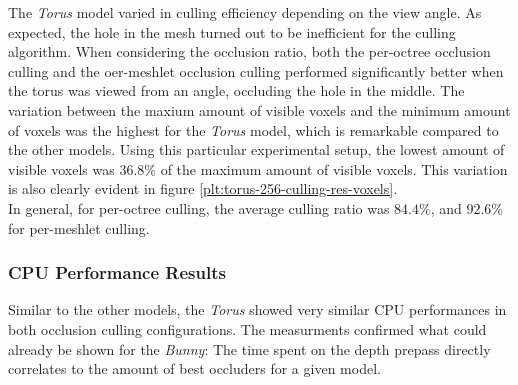 
\noindent
The \emph{Torus} model varied in culling efficiency depending on the view angle. As expected, the hole 
in the mesh turned out to be inefficient for the culling algorithm. When considering the occlusion ratio, 
both the per-octree occlusion culling and the oer-meshlet occlusion culling performed significantly better 
when the torus was viewed from an angle, occluding the hole in the middle. The variation between the maxium 
amount of visible voxels and the minimum amount of voxels was the highest for the \emph{Torus} model, which 
is remarkable compared to the other models. Using this particular experimental setup, the lowest amount of 
visible voxels was $36.8\%$ of the maximum amount of visible voxels. This variation is also clearly evident 
in figure \ref{plt:torus-256-culling-res-voxels}. \\ 

\noindent
In general, for per-octree culling, the average culling ratio was $84.4\%$, and $92.6\%$ for per-meshlet culling. 

\subsubsection*{CPU Performance Results} \label{subsubsec-cpu-performance-results-torus}

Similar to the other models, the \emph{Torus} showed very similar \ac{CPU} performances in both 
occlusion culling configurations. The measurments confirmed what could already be shown for the 
\emph{Bunny}: The time spent on the depth prepass directly correlates to the amount of best occluders 
for a given model.


